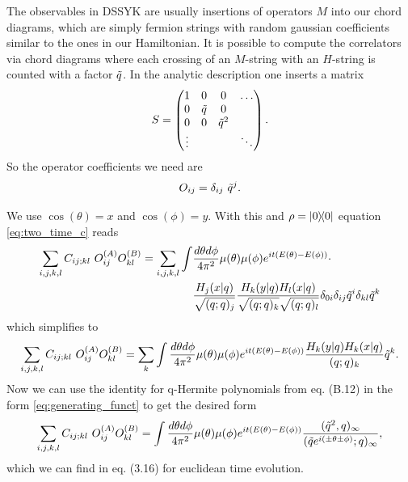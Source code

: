 \documentclass[12pt]{scrarticle}
\begin{document}
The observables in DSSYK are usually insertions of operators $M$ into our chord diagrams, which are simply fermion strings with random gaussian coefficients similar to the ones in our Hamiltonian. It is possible to compute the correlators via chord diagrams where each crossing of an $M$-string with an $H$-string is counted with a factor $\Tilde{q}$. In the analytic description one inserts a matrix 
\begin{align}
    S = \begin{pmatrix}
        1 & 0 & 0 & \ldots \\ 
        0 & \Tilde{q} & 0\\
        0 & 0&\Tilde{q}^2 \\
        \vdots & & & \ddots
    \end{pmatrix}.
\end{align}
So the operator coefficients we need are
\begin{align}
    O_{ij} = \delta_{ij} \ \Tilde{q}^j.
\end{align}

We use $\cos(\theta) = x$ and $\cos(\phi) = y$. With this and $\rho = \ketbra{0}{0}$ equation \cref{eq:two_time_c} reads
\begin{align}
    \sum_{i,j, k, l} C_{ij;kl} \ O_{ij}^{(A)} O_{kl}^{(B)} = \sum_{i,j,k,l} \int &\frac{d\theta d\phi}{4 \pi^2} \mu(\theta) \mu(\phi) e^{i t(E(\theta) - E(\phi))} \cdot \nonumber
    \\ &\frac{H_j(x|q)}{\sqrt{(q;q)_j}} \frac{H_k(y|q) H_l(x|q)}{\sqrt{(q;q)_k}\sqrt{(q;q)_l}} \delta_{0i} \delta_{ij} \Tilde{q}^i \delta_{kl} \Tilde{q}^k
\end{align}
which simplifies to
\begin{align}
    \sum_{i,j, k, l} C_{ij;kl} \ O_{ij}^{(A)} O_{kl}^{(B)} 
    = \sum_{k} \int \frac{d\theta d\phi}{4 \pi^2} \mu(\theta) \mu(\phi) e^{i t(E(\theta) - E(\phi))} \frac{H_k(y|q) H_k(x|q)}{(q;q)_k} \Tilde{q}^k.
 \end{align}
Now we can use the identity for q-Hermite polynomials from \cite{berkooz_towards_2018} eq. (B.12) in the form \cref{eq:generating_funct} to get the desired form
\begin{align}
     \sum_{i,j, k, l} C_{ij;kl} \ O_{ij}^{(A)} O_{kl}^{(B)} =
     \int \frac{d\theta d\phi}{4 \pi^2} \mu(\theta) \mu(\phi) e^{i t(E(\theta) - E(\phi))} \frac{(\Tilde{q}^2, q)_\infty}{(\Tilde{q} e^{i(\pm \theta \pm \phi)}; q)_\infty},
\end{align}
which we can find in \cite{berkooz_towards_2018} eq. (3.16) for euclidean time evolution.
\end{document}
